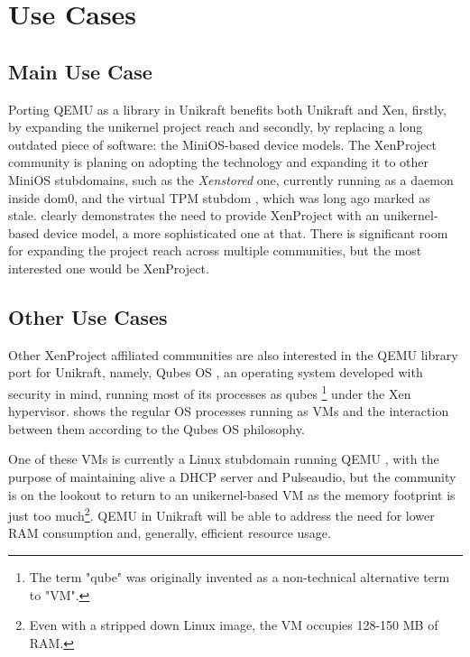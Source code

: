 \chapter{Use Cases}
\label{chapter:use-cases}

\section{Main Use Case}
\label{sec:main-use-case}

Porting QEMU as a library in Unikraft benefits both Unikraft and Xen, firstly, by expanding the unikernel project reach and secondly, by replacing a long outdated piece of software: the MiniOS-based device models.
The XenProject community is planing on adopting the technology and expanding it to other MiniOS stubdomains, such as the \textit{Xenstored} \cite{xenstored-stubdom} one, currently running as a daemon inside dom0, and the virtual TPM stubdom \cite{xen-tpm-stubdom}, which was long ago marked as stale.
 clearly demonstrates the need to provide XenProject with an unikernel-based device model, a more sophisticated one at that.
There is significant room for expanding the project reach across multiple communities, but the most interested one would be XenProject.


\section{Other Use Cases}
\label{sec:other-use-cases}

Other XenProject affiliated communities are also interested in the QEMU library port for Unikraft, namely, Qubes OS \cite{qubes-os}, an operating system developed with security in mind, running most of its processes as qubes \footnote{The term "qube" was originally invented as a non-technical alternative term to "VM".} under the Xen hypervisor.
 shows the regular OS processes running as VMs and the interaction between them according to the Qubes OS philosophy.


One of these VMs is currently a Linux stubdomain running QEMU \cite{qubes-os-linux-stubdom}, with the purpose of maintaining alive a DHCP server and Pulseaudio, but the community is on the lookout to return to an unikernel-based VM as the memory footprint is just too much\footnote{Even with a stripped down Linux image, the VM occupies 128-150 MB of RAM.}.
QEMU in Unikraft will be able to address the need for lower RAM consumption and, generally, efficient resource usage.


